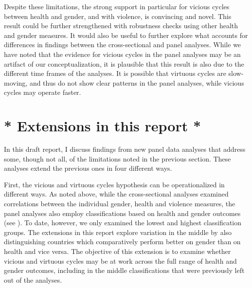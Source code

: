 \documentclass[12pt]{article}
\begin{document}
Despite these limitations, the strong support in particular for vicious cycles between health and gender, and with violence, is convincing and novel.
This result could be further strengthened with robustness checks using other health and gender measures.
It would also be useful to further explore what accounts for differences in findings between the cross-sectional and panel analyses.
While we have noted that the evidence for vicious cycles in the panel analyses may be an artifact of our conceptualization, it is plausible that this result is also due to the different time frames of the analyses. It is possible that virtuous cycles are slow-moving, and thus do not show clear patterns in the panel analyses, while vicious cycles may operate faster.

\section{* Extensions in this report *}
\label{extensions}

In this draft report, I discuss findings from new panel data analyses that address some, though not all, of the limitations noted in the previous section. These analyses extend the previous ones in four different ways.

First, the vicious and virtuous cycles hypothesis can be operationalized in different ways. As noted above, while the cross-sectional analyses examined correlations between the individual gender, health and violence measures, the panel analyses also employ classifications based on health and gender outcomes (see ). To date, however, we only examined the lowest and highest classification groups. The extensions in this report explore variation in the middle by also distinguishing countries which comparatively perform better on gender than on health and vice versa. The objective of this extension is to examine whether vicious and virtuous cycles may be at work across the full range of health and gender outcomes, including in the middle classifications that were previously left out of the analyses.
\end{document}
